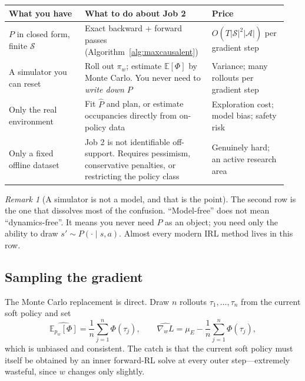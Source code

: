 \documentclass[11pt]{article}
\theoremstyle{plain}
\theoremstyle{definition}
\theoremstyle{remark}
\newtheorem{remark}[theorem]{Remark}
\renewcommand{\S}{\mathcal{S}}
\newcommand{\A}{\mathcal{A}}
\newcommand{\E}{\mathbb{E}}
\begin{document}
\begin{center}
\begin{tabular}{@{}p{0.26\linewidth}p{0.42\linewidth}p{0.26\linewidth}@{}}
\toprule
\textbf{What you have} & \textbf{What to do about Job 2} & \textbf{Price}\\
\midrule
$P$ in closed form, finite $\S$ & Exact backward + forward passes
(Algorithm~\ref{alg:maxcausalent}) & $O(T|\S|^2|\A|)$ per gradient step\\
A simulator you can reset & Roll out $\pi_w$; estimate $\E[\Phi]$ by Monte
Carlo. You never need to \emph{write down} $P$ & Variance; many rollouts
per gradient step\\
Only the real environment & Fit $\widehat P$ and plan, or estimate
occupancies directly from on-policy data & Exploration cost; model bias;
safety risk\\
Only a fixed offline dataset & Job 2 is not identifiable off-support.
Requires pessimism, conservative penalties, or restricting the policy
class & Genuinely hard; an active research area\\
\bottomrule
\end{tabular}
\end{center}

\begin{remark}[A simulator is not a model, and that is the point]
The second row is the one that dissolves most of the confusion.
``Model-free'' does not mean ``dynamics-free''. It means you never need
$P$ as an object; you need only the ability to draw $s'\sim P(\cdot\mid
s,a)$. Almost every modern IRL method lives in this row.
\end{remark}

\subsection{Sampling the gradient}

The Monte Carlo replacement is direct. Draw $n$ rollouts
$\tau_1,\ldots,\tau_n$ from the current soft policy and set
\begin{equation}
\widehat{\E_{p_w}[\Phi]} = \frac1n\sum_{j=1}^n \Phi(\tau_j), \qquad
\widehat{\nabla_w L} = \mu_E - \frac1n\sum_{j=1}^n \Phi(\tau_j),
\label{eq:mcgrad}
\end{equation}
which is unbiased and consistent. The catch is that the current soft
policy must itself be obtained by an inner forward-RL solve at every outer
step---extremely wasteful, since $w$ changes only slightly.
\end{document}
